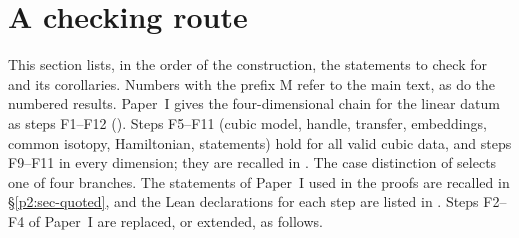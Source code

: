 \section{A checking route}\label{p2:sec-guide}

This section lists, in the order of the construction, the statements to check for  and its
corollaries. Numbers with the prefix M refer to the main text, as do the numbered results. Paper~I \cite{PaperI} gives
the four-dimensional chain for the linear datum as steps F1--F12 (). Steps F5--F11 (cubic model,
handle, transfer, embeddings, common isotopy, Hamiltonian, statements) hold for all valid cubic data, and steps F9--F11
in every dimension; they are recalled in . The case distinction of
 selects one of four branches. The statements of Paper~I used in the proofs are
recalled in \S\ref{p2:sec-quoted}, and the Lean declarations for each step are listed in .
Steps F2--F4 of Paper~I are replaced, or extended, as follows.

